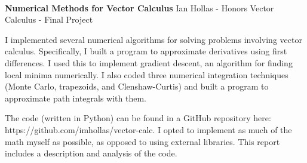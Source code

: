 \documentclass[11pt]{article}
\theoremstyle{plain}
\begin{document}
\thispagestyle{empty}
\bigskip \
\vspace{0.1cm}

\begin{center}
{\fontsize{20}{20} \selectfont \bf \sffamily Numerical Methods for Vector Calculus}
\vskip 14pt
{\fontsize{14}{14} \selectfont \rmfamily Ian Hollas - Honors Vector Calculus - Final Project} 
\vskip 6pt
\vskip 24pt
\end{center}

\large
I implemented several numerical algorithms for solving problems involving vector calculus. Specifically, I built a program to approximate derivatives using first differences. I used this to implement gradient descent, an algorithm for finding local minima numerically. I also coded three numerical integration techniques (Monte Carlo, trapezoids, and Clenshaw-Curtis) and built a program to approximate path integrals with them.  
\par
The code (written in Python) can be found in a GitHub repository here: \\ https://github.com/imhollas/vector-calc. I opted to implement as much of the math myself as possible, as opposed to using external libraries. This report includes a description and analysis of the code.


\newpage
\microtoc
\newpage

\end{document}
